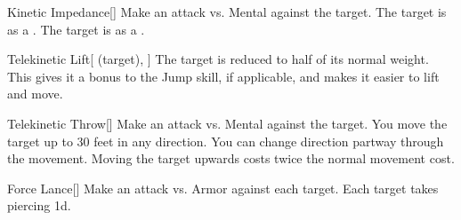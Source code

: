 \lowercase{\hypertarget{spell:Kinetic Impedance}{}}\label{spell:Kinetic Impedance}
\begin{freeability}[Rank 1]{\hypertarget{spell:Kinetic Impedance}{Kinetic Impedance}}[]
Make an attack vs. Mental against the target.
\hit The target is  as a .
\crit The target is  as a .
\end{freeability}
\vspace{0.25em}



\lowercase{\hypertarget{spell:Telekinetic Lift}{}}\label{spell:Telekinetic Lift}
\begin{attuneability}[Rank 1]{\hypertarget{spell:Telekinetic Lift}{Telekinetic Lift}}[ (target), ]
The target is reduced to half of its normal weight.
This gives it a  bonus to the Jump skill, if applicable, and makes it easier to lift and move.
\end{attuneability}
\vspace{0.25em}



\lowercase{\hypertarget{spell:Telekinetic Throw}{}}\label{spell:Telekinetic Throw}
\begin{freeability}[Rank 1]{\hypertarget{spell:Telekinetic Throw}{Telekinetic Throw}}[]
Make an attack vs. Mental against the target.
\hit You move the target up to 30 feet in any direction.
You can change direction partway through the movement.
Moving the target upwards costs twice the normal movement cost.
\end{freeability}
\vspace{0.25em}



\lowercase{\hypertarget{spell:Force Lance}{}}\label{spell:Force Lance}
\begin{freeability}[Rank 3]{\hypertarget{spell:Force Lance}{Force Lance}}[]
Make an attack vs. Armor against each target.
\hit Each target takes piercing  \plus1d.
\end{freeability}
\vspace{0.25em}



